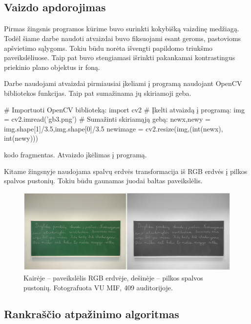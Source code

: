 \documentclass[a4paper,12pt]{article}
\begin{document}
\subsection{Vaizdo apdorojimas}
 \paragraph{} Pirmas žingsnis programos kūrime buvo surinkti kokybišką vaizdinę medžiagą. Todėl šiame darbe naudoti atvaizdai buvo fiksuojami esant geroms, pastovioms apšvietimo sąlygoms. Tokiu būdu norėta išvengti papildomo triukšmo paveikslėliuose. Taip pat buvo stengiamasi išrinkti pakankamai kontrastingus priekinio plano objektus ir foną.
 
 Darbe naudojami atvaizdai pirmiausiai įkeliami į programą naudojant OpenCV bibliotekos funkcijas. Taip pat sumažinama jų skiriamoji geba.
\begin{listing}[H]
	\begin{pythoncode}
# Importuoti OpenCV biblioteką:
import cv2
# Įkelti atvaizdą į programą:
img = cv2.imread('gb3.png')
# Sumažinti skiriamąją gebą:
newx,newy = img.shape[1]/3.5,img.shape[0]/3.5
newimage = cv2.resize(img,(int(newx), int(newy)))
	\end{pythoncode}
	\caption{kodo fragmentas. Atvaizdo įkėlimas į programą.}	
\end{listing}
Kitame žingsnyje naudojama spalvų erdvės transformacija iš RGB erdvės į pilkos spalvos pustonių. Tokiu būdu gaunamas juodai baltas paveikslėlis.

		\begin{figure}[H]
			\centering
			\includegraphics[scale=0.4]{images/bgr2gray}
			\caption{Kairėje – paveikslėlis RGB erdvėje, dešinėje – pilkos spalvos pustonių. Fotografuota VU MIF, 409 auditorijoje.}   %
			\label{img:bgr2gray}
		\end{figure}

\subsection{Rankraščio atpažinimo algoritmas}
\end{document}
